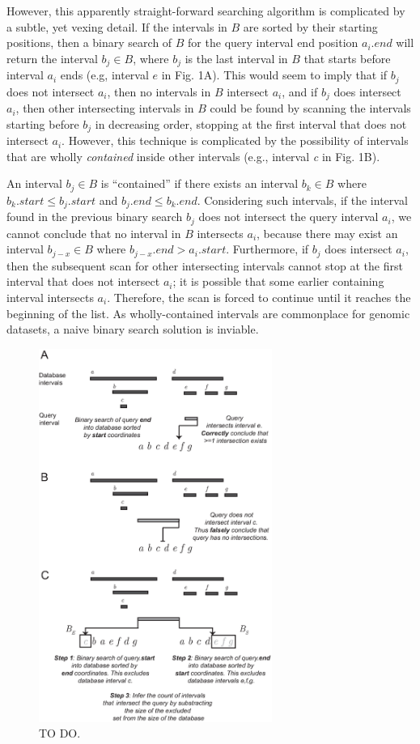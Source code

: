 \documentclass{bioinfo}
\begin{document}
	However, this apparently straight-forward searching algorithm is 
	complicated by a subtle, yet vexing detail. If the intervals in $B$ 
	are sorted by their starting positions, then a binary search of $B$ 
	for the query interval end position $a_i.end$ will return the 
	interval $b_j \in B$, where $b_j$ is the last interval in $B$ that 
	starts before interval $a_i$ ends (e.g, interval $e$ in Fig. 1A).  
	This would seem to imply that if $b_j$ does not intersect $a_i$, 
	then no intervals in $B$ intersect $a_i$, and if $b_j$ does intersect
	$a_i$, then other intersecting intervals in $B$ could be found by scanning the
	intervals starting before $b_j$ in decreasing order, stopping at the first
	interval that does not intersect $a_i$.  However, this technique is 
	complicated by the possibility of intervals that are wholly {\em contained} 
	inside other intervals (e.g., interval \emph{c} in Fig. 1B). 
	
	An interval $b_j\in B$ is ``contained'' if there exists an interval
	$b_k \in B$ where $b_k.start \leq b_j.start$ and $b_j.end \leq
	b_k.end$.  Considering such intervals, if the interval found in the
	previous binary search $b_j$ does not intersect the query interval
	$a_i$, we cannot conclude that no interval in $B$ intersects $a_i$,
	because there may exist an interval $b_{j-x} \in B$ where $b_{j-x}.end
	> a_i.start$.  Furthermore, if $b_j$ does intersect $a_i$, then the
	subsequent scan for other intersecting intervals cannot stop at the
	first interval that does not intersect $a_i$; it is possible that some
	earlier containing interval intersects $a_i$. Therefore, the scan is
	forced to continue until it reaches the beginning of the list. As 
	wholly-contained intervals are commonplace for genomic datasets,
	a naive binary search solution is inviable.
	
	\begin{figure}[h]
		\centering
		\includegraphics[width=3in]{figures/Figure1.v3.eps}
		\caption{TO DO.}
		\label{bitssearching}
	\end{figure}
	
\end{document}

